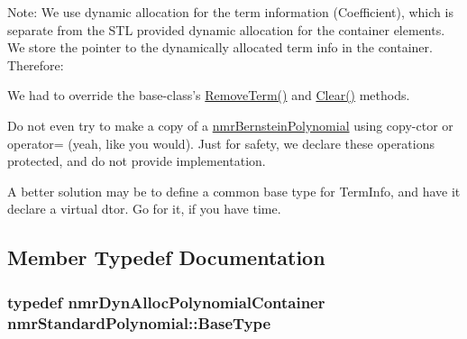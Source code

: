 Note\-: We use dynamic allocation for the term information (Coefficient), which is separate from the S\-T\-L provided dynamic allocation for the container elements. We store the pointer to the dynamically allocated term info in the container. Therefore\-:
\begin{DoxyEnumerate}
\item We had to override the base-\/class's \hyperlink{classnmr_standard_polynomial_a0149f843c87d2082933b4d317f9ca69d}{Remove\-Term()} and \hyperlink{classnmr_standard_polynomial_a7efcdc4097121d65de20dde2523e6525}{Clear()} methods.
\item Do not even try to make a copy of a \hyperlink{classnmr_bernstein_polynomial}{nmr\-Bernstein\-Polynomial} using copy-\/ctor or operator= (yeah, like you would). Just for safety, we declare these operations protected, and do not provide implementation.
\item A better solution may be to define a common base type for Term\-Info, and have it declare a virtual dtor. Go for it, if you have time. 
\end{DoxyEnumerate}

\subsection{Member Typedef Documentation}
\hypertarget{classnmr_standard_polynomial_ae0b28e9d73a5480047ee5d85be633b89}{
\subsubsection[{Base\-Type}]{\setlength{\rightskip}{0pt plus 5cm}typedef {\bf nmr\-Dyn\-Alloc\-Polynomial\-Container} {\bf nmr\-Standard\-Polynomial\-::\-Base\-Type}}}\label{classnmr_standard_polynomial_ae0b28e9d73a5480047ee5d85be633b89}


